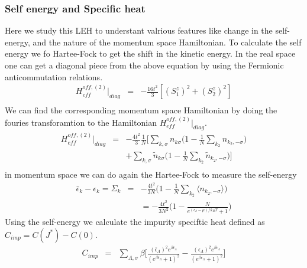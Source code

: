 \documentclass[reprint,prb,superscriptaddress]{revtex4-1}
\begin{document}
\subsubsection{Self energy and Specific heat}
Here we study this LEH to understant valrious features like change in the self-energy, and the nature of the momentum space Hamiltonian. To calculate the self energy we fo Hartee-Fock to get the shift in the kinetic energy.
In the real space one can get a diagonal piece from the above equation by using the Fermionic anticommutation relations.
\begin{eqnarray}
H_{eff}^{off,(2)} |_{diag} &=& -\frac{16t^2}{3} [ (S_1^z)^2+ (S_2^z)^2 ]  \nonumber\\
\end{eqnarray}
We can find the corresponding momentum space Hamiltonian by doing the fouries transforamtion to the Hamiltonian $H_{eff}^{off,(2)} |_{diag} $.
\begin{eqnarray}
H_{eff}^{off,(2)} |_{diag}&=& -\frac{4t^2}{3} \frac{1}{N} \bigg[ \displaystyle\sum_{k,\sigma} n_{k\sigma}\bigg(1-\frac{1}{N} \displaystyle\sum_{k_2}  n_{k_2,-\sigma} \bigg) \nonumber\\
&&+ \displaystyle\sum_{k,\sigma} \tilde{n}_{k\sigma}\bigg( 1-\frac{1}{N} \displaystyle\sum_{ k_2} \tilde{n}_{k_2,-\sigma} \bigg) \bigg] \nonumber\\
\end{eqnarray}
in momentum space we can do again the Hartee-Fock to measure the self-energy
\begin{eqnarray}
\bar{\epsilon}
_k-\epsilon_k=\Sigma_k &=& -\frac{4t^2}{3N} \bigg(1-\frac{1}{N} \displaystyle\sum_{k_2}  \langle n_{k_2,-\sigma} \rangle \bigg) \nonumber\\
&&= -\frac{4t^2}{3N^2}\bigg(1-\frac{N}{e^{(\epsilon_k-\mu)/k_BT}+1}\bigg)
\label{eq:self-energy-NFL}
\end{eqnarray}
Using the self-energy we calculate the impurity speciftic heat defined as $C_{imp}=C(J^*)-C(0)$.
\begin{eqnarray}
C_{imp} &=& \sum_{\Lambda,\sigma} \beta \bigg[ \frac{(\bar{\epsilon}_{\Lambda})^2 e^{\beta \bar{\epsilon}_{\Lambda}}}{( e^{\beta \bar{\epsilon}_{\Lambda}} +1)^2}  -\frac{({\epsilon}_{\Lambda})^2 e^{\beta {\epsilon}_{\Lambda}}}{( e^{\beta {\epsilon}_{\Lambda}} +1)^2} \bigg]
\end{eqnarray}
\end{document}
